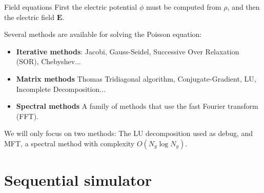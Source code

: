 \documentclass{beamer}
\newcommand*\V[1]{\bm{#1}}
\newcommand{\E}{\V{E}}
\begin{document}
\begin{frame}{Field equations}{}
First the electric potential $\phi$ must be computed from $\rho$, and then the 
electric field $\E$.

\vspace{1em}
Several methods are available for solving the Poisson equation:

\begin{itemize}
\setlength\itemsep{1em}
\item \textbf{Iterative  methods}: Jacobi, Gauss-Seidel, Successive Over 
Relaxation (SOR), Chebyshev...
\item \textbf{Matrix methods} Thomas Tridiagonal algorithm, Conjugate-Gradient, 
LU, Incomplete Decomposition...
\item \textbf{Spectral methods} A family of methods that use the fast Fourier 
transform (FFT).
\end{itemize}

\vspace{1em}
We will only focus on two methods: The LU decomposition used as debug, and MFT, 
a spectral method with complexity $O(N_g \log N_g)$.
\end{frame}

\section{Sequential simulator}
\end{document}

